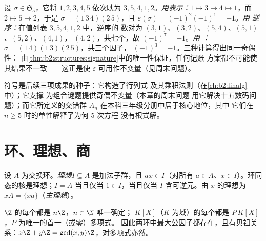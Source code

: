 \begin{example}[通向同一符号的三条路]\label{ex:b2:structures:threeroads}
设 $\sigma \in \mathfrak{S}_5$，它将 $1, 2, 3, 4, 5$ 依次映为 $3, 5, 4,
1, 2$。\emph{用表示：}$1 \mapsto 3 \mapsto 4 \mapsto 1$，而 $2
\mapsto 5 \mapsto 2$，于是 $\sigma = (1\,3\,4)(2\,5)$，且
$\varepsilon(\sigma) = (-1)^{2}(-1)^{1} = -1$。\emph{用
逆序：}在值列表 $3, 5, 4, 1, 2$ 中，逆序的
数对为 $(3,1)$、$(3,2)$、$(5,4)$、$(5,1)$、$(5,2)$、$(4,1)$，
$(4,2)$，共七个，故 $(-1)^7 = -1$。\emph{用
：}$\sigma = (1\,4)(1\,3)(2\,5)$，共三个因子，
$(-1)^3 = -1$。三种计算得出同一奇偶性：
由\cref{thm:b2:structures:signature}中的唯一性保证，任何记账
方案都不可能使其结果不一致——这正是使
$\varepsilon$ 可用作不变量（见周末问题）。
\end{example}

\begin{remark}[符号的后续应用]
符号是后续三项成果的种子：它构造了行列式
及其乘积法则（在\cref{ch:b2:linalg}中）；它支撑
为组合谜题提供奇偶不变量（本章的周末问题
用它解决十五数码问题）；而它所定义的交错群
$A_n$ 在本科三年级分册中居于核心地位，其中
它们在 $n \geq 5$ 时的单性解释了为何 $5$ 次方程
没有根式解。
\end{remark}

\section{环、理想、商}

\begin{definition}[理想]\label{def:b2:structures:ideal}
设 $A$ 为交换环。\emph{理想}$I
\subseteq A$ 是加法子群，且 $a x \in I$（对所有
$a \in A$、$x \in I$）。环同态的核是理想；$I = A$
当且仅当 $1 \in I$，当且仅当 $I$ 含可逆元。由 $x$ \emph{}
的理想为 $xA = \{xa\}$（\emph{主理想}）。
\end{definition}

\begin{theorem}[{$\Z$ 与 $K[X]$ 的理想}]\label{thm:b2:structures:principal}
$\Z$ 的每个都是 $n\Z$，$n \in \N$ 唯一确定；
$K[X]$（$K$ 为域）的每个都是 $P\,K[X]$，$P$ 为唯一的首一（或零）多项式。
因此两环中最大公因子都存在，且有贝祖关系：$x\Z +
y\Z = \gcd(x,y)\Z$，对多项式亦然。
\end{theorem}

